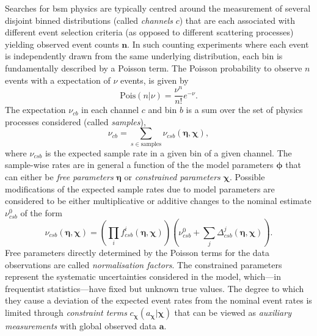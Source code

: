 Searches for \gls{bsm} physics are typically centred around the measurement of several disjoint binned distributions (called \textit{channels} $c$) that are each associated with different event selection criteria (as opposed to different scattering processes) yielding observed event counts $\boldsymbol{n}$. In such counting experiments where each event is independently drawn from the same underlying distribution, each bin is fundamentally described by a Poisson term. The Poisson probability to observe $n$ events with a expectation of $\nu$ events, is given by
\begin{equation}
	\mathrm{Pois}(n\vert\nu) = \frac{\nu^n}{n!}e^{-\nu}.
\end{equation}
The expectation $\nu_{cb}$ in each channel $c$ and bin $b$ is a sum over the set of physics processes considered (called \textit{samples}),
\begin{equation}
	\nu_{cb} = \sum_{s\in\mathrm{samples}}\nu_{csb}(\boldsymbol{\eta},\boldsymbol{\chi}),
\end{equation}
where $\nu_{csb}$ is the expected sample rate in a given bin of a given channel. The sample-wise rates are in general a function of the the model parameters $\boldsymbol{\phi}$ that can either be \textit{free parameters} $\boldsymbol{\eta}$ or \textit{constrained parameters} $\boldsymbol{\chi}$. Possible modifications of the expected sample rates due to model parameters are considered to be either multiplicative or additive changes to the nominal estimate $\nu_{csb}^0$ of the form
\begin{equation}
	\nu_{csb}(\boldsymbol{\eta},\boldsymbol{\chi}) = \left(\prod_i f^i_{csb}(\boldsymbol{\eta},\boldsymbol{\chi}) \right)\left(\nu^0_{csb} + \sum_j {\Delta^j_{csb}(\boldsymbol{\eta},\boldsymbol{\chi})} \right).
\end{equation}
Free parameters directly determined by the Poisson terms for the data observations are called \textit{normalisation factors}. The constrained parameters represent the systematic uncertainties considered in the model, which---in frequentist statistics---have fixed but unknown true values. The degree to which they cause a deviation of the expected event rates from the nominal event rates is limited through \textit{constraint terms} $c_{\boldsymbol{\chi}}(a_{\boldsymbol{\chi}}\vert\boldsymbol{\chi})$ that can be viewed as \textit{auxiliary measurements} with global observed data $\boldsymbol{a}$. 


